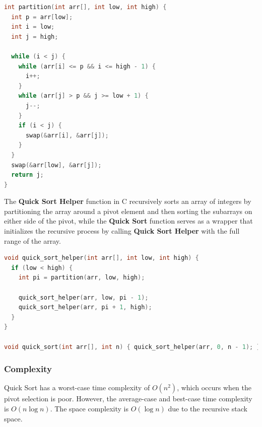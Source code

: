 \documentclass{article}
\begin{document}
\newpage
\begin{lstlisting}[language=C, caption=Partition implementation]
int partition(int arr[], int low, int high) {
  int p = arr[low];
  int i = low;
  int j = high;

  while (i < j) {
    while (arr[i] <= p && i <= high - 1) {
      i++;
    }
    while (arr[j] > p && j >= low + 1) {
      j--;
    }
    if (i < j) {
      swap(&arr[i], &arr[j]);
    }
  }
  swap(&arr[low], &arr[j]);
  return j;
}
\end{lstlisting}

The \textbf{Quick Sort Helper} function in C recursively sorts an array of integers by partitioning the array around a pivot element and then sorting the subarrays on either side of the pivot, while the \textbf{Quick Sort} function serves as a wrapper that initializes the recursive process by calling \textbf{Quick Sort Helper} with the full range of the array.

\begin{lstlisting}[language=C, caption=Quick Sort implementation]
void quick_sort_helper(int arr[], int low, int high) {
  if (low < high) {
    int pi = partition(arr, low, high);

    quick_sort_helper(arr, low, pi - 1);
    quick_sort_helper(arr, pi + 1, high);
  }
}

void quick_sort(int arr[], int n) { quick_sort_helper(arr, 0, n - 1); }
\end{lstlisting}

\subsubsection{Complexity}
Quick Sort has a worst-case time complexity of $O(n^2)$, which occurs when the pivot selection is poor. However, the average-case and best-case time complexity is $O(n \log n)$. The space complexity is $O(\log n)$ due to the recursive stack space.
\end{document}
